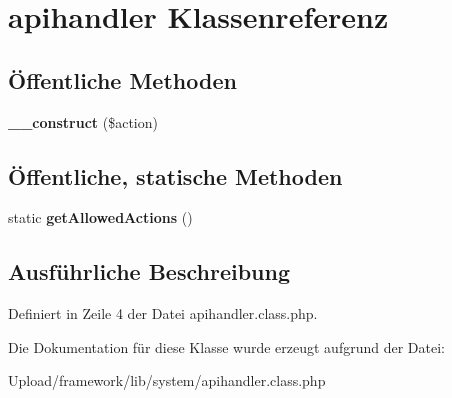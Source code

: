 \hypertarget{classapihandler}{}\section{apihandler Klassenreferenz}
\label{classapihandler}
\subsection*{Öffentliche Methoden}
\begin{DoxyCompactItemize}
\item 
\mbox{\label{classapihandler_a6133274b9a84041d8f5586ef477da38a}} 
{\bfseries \+\_\+\+\_\+construct} (\$action)
\end{DoxyCompactItemize}
\subsection*{Öffentliche, statische Methoden}
\begin{DoxyCompactItemize}
\item 
\mbox{\label{classapihandler_abc516fc14bf5f55bcadb14a45e1ebb8a}} 
static {\bfseries get\+Allowed\+Actions} ()
\end{DoxyCompactItemize}


\subsection{Ausführliche Beschreibung}


Definiert in Zeile 4 der Datei apihandler.\+class.\+php.



Die Dokumentation für diese Klasse wurde erzeugt aufgrund der Datei\+:\begin{DoxyCompactItemize}
\item 
Upload/framework/lib/system/apihandler.\+class.\+php\end{DoxyCompactItemize}
